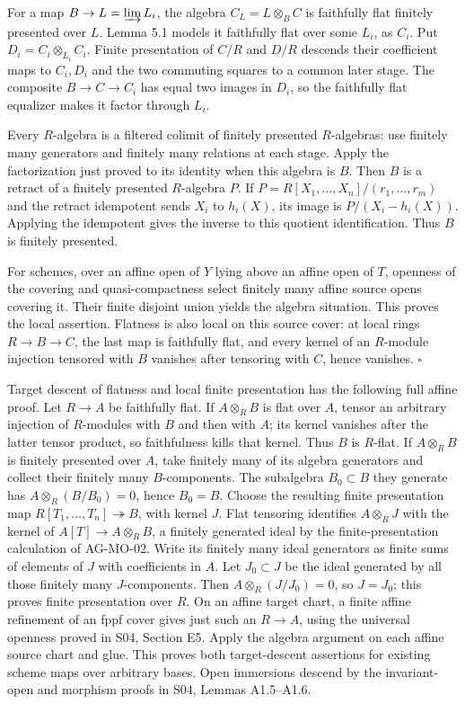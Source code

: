 \documentclass[11pt,a4paper,openany]{report}
\begin{document}
For a map \(B\to L=\varinjlim L_i\), the algebra \(C_L=L\otimes_B C\) is faithfully flat finitely presented over \(L\). Lemma 5.1 models it faithfully flat over some \(L_i\), as \(C_i\). Put \(D_i=C_i\otimes_{L_i}C_i\). Finite presentation of \(C/R\) and \(D/R\) descends their coefficient maps to \(C_i,D_i\) and the two commuting squares to a common later stage. The composite \(B\to C\to C_i\) has equal two images in \(D_i\), so the faithfully flat equalizer makes it factor through \(L_i\).

Every \(R\)-algebra is a filtered colimit of finitely presented \(R\)-algebras: use finitely many generators and finitely many relations at each stage. Apply the factorization just proved to its identity when this algebra is \(B\). Then \(B\) is a retract of a finitely presented \(R\)-algebra \(P\). If \(P=R[X_1,\ldots,X_n]/(r_1,\ldots,r_m)\) and the retract idempotent sends \(X_i\) to \(h_i(X)\), its image is \(P/(X_i-h_i(X))\). Applying the idempotent gives the inverse to this quotient identification. Thus \(B\) is finitely presented.

For schemes, over an affine open of \(Y\) lying above an affine open of \(T\), openness of the covering and quasi-compactness select finitely many affine source opens covering it. Their finite disjoint union yields the algebra situation. This proves the local assertion. Flatness is also local on this source cover: at local rings \(R\to B\to C\), the last map is faithfully flat, and every kernel of an \(R\)-module injection tensored with \(B\) vanishes after tensoring with \(C\), hence vanishes. \(\square\)

Target descent of flatness and local finite presentation has the following full affine proof. Let \(R\to A\) be faithfully flat. If \(A\otimes_R B\) is flat over \(A\), tensor an arbitrary injection of \(R\)-modules with \(B\) and then with \(A\); its kernel vanishes after the latter tensor product, so faithfulness kills that kernel. Thus \(B\) is \(R\)-flat. If \(A\otimes_R B\) is finitely presented over \(A\), take finitely many of its algebra generators and collect their finitely many \(B\)-components. The subalgebra \(B_0\subset B\) they generate has \(A\otimes_R(B/B_0)=0\), hence \(B_0=B\). Choose the resulting finite presentation map \(R[T_1,\ldots,T_n]\twoheadrightarrow B\), with kernel \(J\). Flat tensoring identifies \(A\otimes_RJ\) with the kernel of \(A[T]\to A\otimes_RB\), a finitely generated ideal by the finite-presentation calculation of AG-MO-02. Write its finitely many ideal generators as finite sums of elements of \(J\) with coefficients in \(A\). Let \(J_0\subset J\) be the ideal generated by all those finitely many \(J\)-components. Then \(A\otimes_R(J/J_0)=0\), so \(J=J_0\); this proves finite presentation over \(R\). On an affine target chart, a finite affine refinement of an fppf cover gives just such an \(R\to A\), using the universal openness proved in S04, Section E5. Apply the algebra argument on each affine source chart and glue. This proves both target-descent assertions for existing scheme maps over arbitrary bases. Open immersions descend by the invariant-open and morphism proofs in S04, Lemmas A1.5--A1.6.
\end{document}
